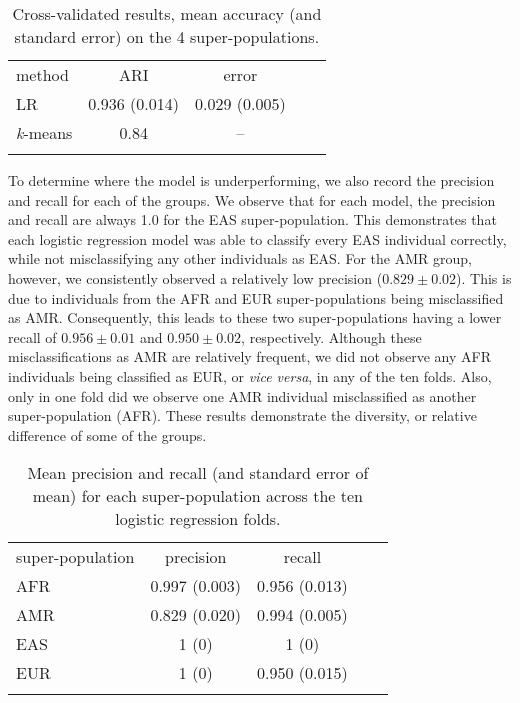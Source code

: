 \documentclass{llncs}
\newcommand{\kMeans}{\textit{k}-means }
\begin{document}
{\begin{table}
\caption{Cross-validated results, mean accuracy (and standard error) on the 4 super-populations.}
\begin{center}
\renewcommand{\arraystretch}{1.4}
\setlength\tabcolsep{3pt}
\begin{tabular}{lcccc}
\hline\noalign{\smallskip}
method  & ARI & error \\
LR  & 0.936 (0.014) & 0.029 (0.005) \\
\kMeans & 0.84 & -- \\
\noalign{\smallskip}
\hline
\end{tabular}
\end{center}
\end{table}

To determine where the model is underperforming, we also record the precision and recall for each of the groups.
We observe that for each model, the precision and recall are always 1.0 for the EAS super-population.
This demonstrates that each logistic regression model was able to classify every EAS individual correctly, while not misclassifying any other individuals as EAS.
For the AMR group, however, we consistently observed a relatively low precision (\(0.829 \pm{} 0.02 \)).
This is due to individuals from the AFR and EUR super-populations being misclassified as AMR.
Consequently, this leads to these two super-populations having a lower recall of \(0.956 \pm 0.01 \) and \(0.950 \pm 0.02 \), respectively.
Although these misclassifications as AMR are relatively frequent, we did not observe any AFR individuals being classified as EUR, or {\it vice versa}, in any of the ten folds.
Also, only in one fold did we observe one AMR individual misclassified as another super-population (AFR).
These results demonstrate the diversity, or relative difference of some of the groups. 

\begin{table}
\caption{Mean precision and recall (and standard error of mean) for each super-population across the ten logistic regression folds.}
\begin{center}
\renewcommand{\arraystretch}{1.4}
\setlength\tabcolsep{3pt}
\begin{tabular}{lcccc}
\hline\noalign{\smallskip}
super-population  & precision & recall \\
AFR  & 0.997 (0.003) & 0.956 (0.013) \\
AMR & 0.829 (0.020) & 0.994 (0.005) \\
EAS  & 1 (0) & 1 (0) \\
EUR  & 1 (0) & 0.950 (0.015) \\
\noalign{\smallskip}
\hline
\end{tabular}
\end{center}
\end{table}







}
\end{document}
